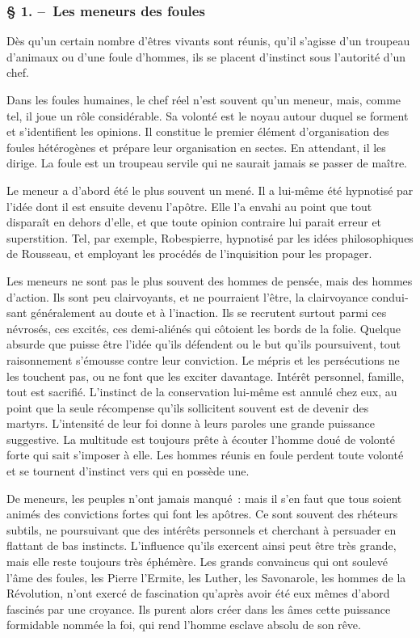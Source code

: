 \documentclass[french,twoside]{book} %
\begin{document}
\subsubsection[{§ 1. – Les meneurs des foules}]{§ 1. – Les meneurs des foules}
\noindent Dès qu’un certain nombre d’êtres vivants sont réunis, qu’il s’agisse d’un troupeau d’animaux ou d’une foule d’hommes, ils se placent d’instinct sous l’autorité d’un chef.\par
Dans les foules humaines, le chef réel n’est souvent qu’un meneur, mais, comme tel, il joue un rôle considérable. Sa volonté est le noyau autour duquel se forment et s’identifient les opinions. Il constitue le premier élément d’organisation des foules hétérogènes et prépare leur organisation en sectes. En attendant, il les dirige. La foule est un troupeau servile qui ne saurait jamais se passer de maître.\par
Le meneur a d’abord été le plus souvent un mené. Il a lui-même été hypnotisé par l’idée dont il est ensuite devenu l’apôtre. Elle l’a envahi au point que tout disparaît en dehors d’elle, et que toute opinion contraire lui parait erreur et superstition. Tel, par exemple, Robespierre, hypnotisé par les idées philosophiques de Rousseau, et employant les procédés de l’inquisition pour les propager.\par
Les meneurs ne sont pas le plus souvent des hommes de pensée, mais des hom­mes d’action. Ils sont peu clairvoyants, et ne pourraient l’être, la clairvoyance condui­sant généralement au doute et à l’inaction. Ils se recrutent surtout parmi ces névrosés, ces excités, ces demi-aliénés qui côtoient les bords de la folie. Quelque absurde que puisse être l’idée qu’ils défendent ou le but qu’ils poursuivent, tout raisonnement s’émousse contre leur conviction. Le mépris et les persécutions ne les touchent pas, ou ne font que les exciter davantage. Intérêt personnel, famille, tout est sacrifié. L’ins­tinct de la conservation lui-même est annulé chez eux, au point que la seule récom­pense qu’ils sollicitent souvent est de devenir des martyrs. L’intensité de leur foi donne à leurs paroles une grande puissance suggestive. La multitude est toujours prête à écouter l’homme doué de volonté forte qui sait s’imposer à elle. Les hommes réunis en foule perdent toute volonté et se tournent d’instinct vers qui en possède une.\par
De meneurs, les peuples n’ont jamais manqué : mais il s’en faut que tous soient animés des convictions fortes qui font les apôtres. Ce sont souvent des rhéteurs subtils, ne poursuivant que des intérêts personnels et cherchant à persuader en flattant de bas instincts. L’influence qu’ils exercent ainsi peut être très grande, mais elle reste toujours très éphémère. Les grands convaincus qui ont soulevé l’âme des foules, les Pierre l’Ermite, les Luther, les Savonarole, les hommes de la Révolution, n’ont exercé de fascination qu’après avoir été eux mêmes d’abord fascinés par une croyance. Ils purent alors créer dans les âmes cette puissance formidable nommée la foi, qui rend l’homme esclave absolu de son rêve.\par
\end{document}
